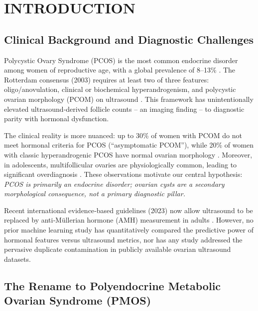 \documentclass[conference]{IEEEtran}
\begin{document}
\section{INTRODUCTION}

\subsection{Clinical Background and Diagnostic Challenges}

Polycystic Ovary Syndrome (PCOS) is the most common endocrine disorder among women of reproductive age, with a global prevalence of 8–13\% \cite{who2025}. The Rotterdam consensus (2003) requires at least two of three features: oligo/anovulation, clinical or biochemical hyperandrogenism, and polycystic ovarian morphology (PCOM) on ultrasound \cite{Rotterdam2004}. This framework has unintentionally elevated ultrasound‑derived follicle counts – an imaging finding – to diagnostic parity with hormonal dysfunction.

The clinical reality is more nuanced: up to 30\% of women with PCOM do not meet hormonal criteria for PCOS (“asymptomatic PCOM”), while 20\% of women with classic hyperandrogenic PCOS have normal ovarian morphology \cite{Dewailly2011}. Moreover, in adolescents, multifollicular ovaries are physiologically common, leading to significant overdiagnosis \cite{Taylor2022}. These observations motivate our central hypothesis: \textit{PCOS is primarily an endocrine disorder; ovarian cysts are a secondary morphological consequence, not a primary diagnostic pillar.}

Recent international evidence‑based guidelines (2023) now allow ultrasound to be replaced by anti‑Müllerian hormone (AMH) measurement in adults \cite{ESHRE2023}. However, no prior machine learning study has quantitatively compared the predictive power of hormonal features versus ultrasound metrics, nor has any study addressed the pervasive duplicate contamination in publicly available ovarian ultrasound datasets.

\subsection{The Rename to Polyendocrine Metabolic Ovarian Syndrome (PMOS)}
\end{document}

